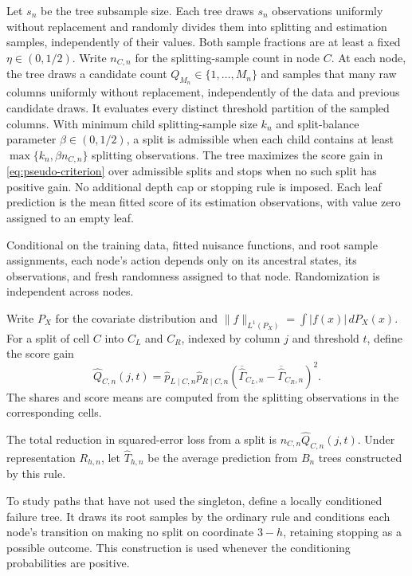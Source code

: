 \documentclass[12pt]{article}
\begin{document}
Let \(s_n\) be the tree subsample size. Each tree draws \(s_n\) observations uniformly without replacement and randomly divides them into splitting and estimation samples, independently of their values. Both sample fractions are at least a fixed \(\eta\in(0,1/2)\). Write \(n_{C,n}\) for the splitting-sample count in node \(C\). At each node, the tree draws a candidate count \(Q_{M_n}\in\{1,\ldots,M_n\}\) and samples that many raw columns uniformly without replacement, independently of the data and previous candidate draws. It evaluates every distinct threshold partition of the sampled columns. With minimum child splitting-sample size \(k_n\) and split-balance parameter \(\beta\in(0,1/2)\), a split is admissible when each child contains at least \(\max\{k_n,\beta n_{C,n}\}\) splitting observations. The tree maximizes the score gain in \eqref{eq:pseudo-criterion} over admissible splits and stops when no such split has positive gain. No additional depth cap or stopping rule is imposed. Each leaf prediction is the mean fitted score of its estimation observations, with value zero assigned to an empty leaf.

Conditional on the training data, fitted nuisance functions, and root sample assignments, each node's action depends only on its ancestral states, its observations, and fresh randomness assigned to that node. Randomization is independent across nodes.

Write \(P_X\) for the covariate distribution and \(\|f\|_{L^1(P_X)}=\int |f(x)|\,dP_X(x)\). For a split of cell \(C\) into \(C_L\) and \(C_R\), indexed by column \(j\) and threshold \(t\), define the score gain
\begin{equation}\label{eq:pseudo-criterion}
\widehat Q_{C,n}(j,t)
=\widehat p_{L\mid C,n}\widehat p_{R\mid C,n}
\left(\overline{\widehat\Gamma}_{C_L,n}
-\overline{\widehat\Gamma}_{C_R,n}\right)^2.
\end{equation}
The shares and score means are computed from the splitting observations in the corresponding cells.

The total reduction in squared-error loss from a split is \(n_{C,n}\widehat Q_{C,n}(j,t)\). Under representation \(R_{h,n}\), let \(\widehat T_{h,n}\) be the average prediction from \(B_n\) trees constructed by this rule.

To study paths that have not used the singleton, define a locally conditioned failure tree. It draws its root samples by the ordinary rule and conditions each node's transition on making no split on coordinate \(3-h\), retaining stopping as a possible outcome. This construction is used whenever the conditioning probabilities are positive.
\end{document}
